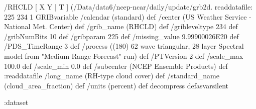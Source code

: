 \begin{ingrid}
  /RHCLD { [ X Y | T ] (/Data/data6/ncep-ncar/daily/update/grb2d.%
  readdatafile:
  225 234 1 GRIBvariable
  /calendar (standard) def
  /center (US Weather Service - National Met. Center) def
  /grib_name (RHCLD) def
  /gribleveltype 234 def
  /gribNumBits 10 def
  /gribparam 225 def
  /missing_value 9.99900026E20 def
  /PDS_TimeRange 3 def
  /process ((180) 62 wave triangular, 28 layer Spectral model from "Medium Range Forecast" run) def
  /PTVersion 2 def
  /scale_max 100.0 def
  /scale_min 0.0 def
  /subcenter (NCEP Ensemble Products) def
  :readdatafile
  /long_name (RH-type cloud cover) def
  /standard_name (cloud_area_fraction) def
  /units (percent) def
  decompress
  } defasvarsilent

 :dataset

\end{ingrid}

